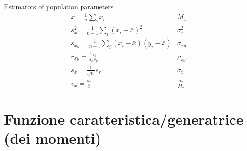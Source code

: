 \documentclass[asd-beamer.tex]{subfiles}
\begin{document}
\begin{frame}{Estimators of population parameters}
\begin{align*}
&\bar{x}=\frac{1}{n}\sum_ix_i&M_x\tag{Mean: first moment}\\
&s_x^2=\frac{1}{n-1}\sum_i(x_i-\bar{x})^2&\sigma_x^2\tag{var: 2nd central moment}\\
&s_{xy}=\frac{1}{n-1}\sum_i(x_i-\bar{x})(y_i-\bar{x})&\sigma_{xy}\tag{covariance}\\
&r_{xy}=\frac{s_{xy}}{s_xs_y}&\rho_{xy}\tag{correlation coefficient}\\
&s_{\bar{x}}=\frac{1}{\sqrt{n}}s_x&\sigma_{\bar{x}}\tag{std deviation of average}\\
&v_x=\frac{s_x}{\bar{x}}&\frac{\sigma_x}{M_x}\tag{relative standard deviation}
\end{align*}
\end{frame}

\section{Funzione caratteristica/generatrice (dei momenti)}
\end{document}
